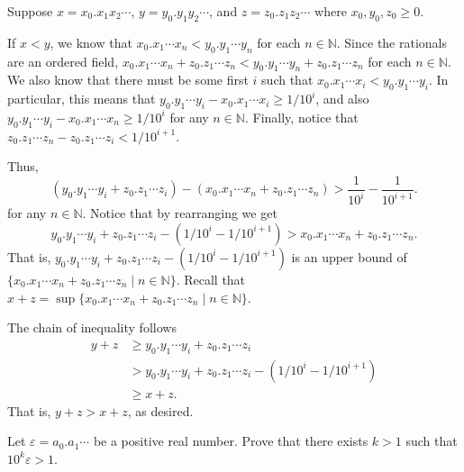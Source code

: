 \documentclass[12 pt, letterpaper]{hmcpset}
\begin{document}
\begin{solution}
	Suppose $x = x_{0}.x_{1} x_{2} \cdots$, $y = y_{0}.y_{1} y_{2} \cdots$, and  $z = z_{0}.z_{1} z_{2} \cdots$ where $x_{0}, y_{0}, z_{0} \ge 0$.

	If $x < y$, we know that $x_{0}.x_{1} \cdots x_{n} < y_{0}.y_{1} \cdots y_{n}$ for each $n \in \mathbb{N}$. Since the rationals are an ordered field, $x_{0}.x_{1} \cdots x_{n} + z_{0}.z_{1} \cdots z_{n} < y_{0}.y_{1} \cdots y_{n} + z_{0}.z_{1} \cdots z_{n}$ for each $n \in \mathbb{N}$. We also know that there must be some first $i$ such that $x_{0}.x_{1} \cdots x_{i} < y_{0}.y_{1} \cdots y_{i}$. In particular, this means that $y_{0}.y_{1} \cdots y_{i} - x_{0}.x_{1} \cdots x_{i} \ge 1/10^{i}$, and also $y_{0}.y_{1} \cdots y_{i} - x_{0}.x_{1} \cdots x_{n} \ge 1/10^{i}$ for any $n \in \mathbb{N}$. Finally, notice that $z_{0}.z_{1} \cdots z_{n} - z_{0}.z_{1} \cdots z_{i} < 1/10^{i + 1}$.

	Thus,
	\[
		(y_{0}.y_{1} \cdots y_{i} + z_{0}.z_{1} \cdots z_{i}) - (x_{0}.x_{1} \cdots x_{n} + z_{0}.z_{1} \cdots z_{n}) > \frac{1}{10^{i}} - \frac{1}{10^{i + 1}}.
	\]
	for any $n \in \mathbb{N}$. Notice that by rearranging we get
	\[
		y_{0}.y_{1} \cdots y_{i} + z_{0}.z_{1} \cdots z_{i} - (1/10^{i} - 1/10^{i + 1}) > x_{0}.x_{1} \cdots x_{n} + z_{0}.z_{1} \cdots z_{n}.
	\]
	That is, $y_{0}.y_{1} \cdots y_{i} + z_{0}.z_{1} \cdots z_{i} - (1/10^{i} - 1/10^{i + 1})$ is an upper bound of $\{ x_{0}.x_{1} \cdots x_{n} + z_{0}.z_{1} \cdots z_{n} \mid n \in \mathbb{N} \}$. Recall that $x + z = \sup \{ x_{0}.x_{1} \cdots x_{n} + z_{0}.z_{1} \cdots z_{n} \mid n \in \mathbb{N} \}$.

	The chain of inequality follows
	\[
		\begin{split}
			y + z & \ge y_{0}.y_{1} \cdots y_{i} + z_{0}.z_{1} \cdots z_{i} \\
			      & > y_{0}.y_{1} \cdots y_{i} + z_{0}.z_{1} \cdots z_{i} - (1/10^{i} - 1/10^{i + 1}) \\
			      & \ge x + z.
		\end{split}
	\]
	That is, $y + z > x + z$, as desired.
\end{solution}

\pagebreak

\begin{problem}[4.]
	Let $\varepsilon = a_{0}.a_{1} \cdots$ be a positive real number. Prove that there exists $k > 1$ such that $10^{k} \varepsilon > 1$.
\end{problem}
\end{document}
